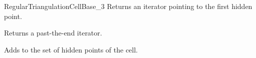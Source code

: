 \begin{ccRefConcept}{RegularTriangulationCellBase_3}
{Returns an iterator pointing to the first hidden point.}

{Returns a past-the-end iterator.}

{Adds  to the set of hidden points of the cell.}

\ccHasModels
{}

\ccSeeAlso
{}

\end{ccRefConcept}


